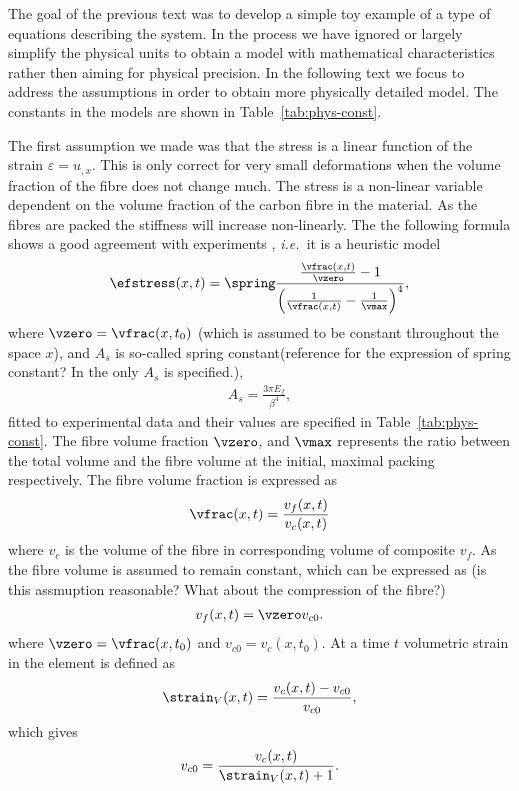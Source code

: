 \documentclass[twoside,a4paper,12pt]{article}
\newcommand{\tabref}[1]{Table~\ref{#1}}
\newcommand{\ie}{{\it i.e.\ }}
\newcommand{\note}[1]{{\color{red}(#1)}}
\begin{document}
The goal of the previous text was to develop a simple toy example of a
type of equations describing the system. In the process we have ignored
or largely simplify the physical units to obtain a model with
mathematical characteristics rather then aiming for physical
precision. In the following text we focus to address the assumptions
in order to obtain more physically detailed model. The constants in the
models are shown in \tabref{tab:phys-const}.

The first assumption we made was that the stress is a linear function
of the strain $\varepsilon = u_{,x}$. This is only correct for very
small deformations when the volume fraction of the fibre does not
change much.  The stress is a non-linear variable dependent on the
volume fraction of the carbon fibre in the material. As the fibres are
packed the stiffness will increase non-linearly. The the following
formula shows a good agreement with experiments \citet{Gutowski1987},
\ie it is a heuristic model
% 
\begin{align}
  \efstress(x,t) = \spring
  \frac{\frac{\vfrac(x,t)}{\vzero} -1}{\left(\frac{1}{\vfrac(x,t)} -\frac{1}{\vmax}\right)^4}, \label{eq:stress-nonlin}
\end{align}
%
where $\vzero = \vfrac(x,t_0)$ \note{which is assumed to be constant
  throughout the space $x$}, and $A_s$ is so-called spring
constant\note{reference for the expression of spring constant? In the
  \citet{Gutowski1987} only $A_s$ is specified.},
%
\begin{align}
  A_s = \frac{3\pi E_f}{\beta^4},
\end{align}
%
fitted to experimental data and their values are specified in
\tabref{tab:phys-const}.
%
The fibre volume fraction $\vzero$, and $\vmax$ represents the ratio
between the total volume and the fibre volume at the initial, maximal
packing respectively. The fibre volume fraction is expressed as
\begin{align}
  \vfrac(x,t) = \frac{v_f(x,t)}{v_c(x,t)}
\end{align}
%
where $v_c$ is the volume of the fibre in corresponding volume of
composite $v_f$. As the fibre volume is assumed to remain constant,
which can be expressed as
%
\note{is this assmuption reasonable? What about the compression of the fibre?}
%
\begin{align}
  v_f(x,t) = \vzero v_{c0}. \label{eq:fibre-fraction}
\end{align}
where $\vzero = \vfrac(x,t_0)$ and $v_{c0} = v_c(x,t_0)$.
%
At a time $t$ volumetric strain in the element is defined as
\begin{align}
  \strain_V(x,t) = \frac{v_c(x,t) - v_{c0}}{v_{c0}}, \label{eq:volumetric-strain}
\end{align}
which gives
%
\begin{align}
{v_{c0}}= \frac{v_c(x,t) }{\strain_V(x,t) + 1}. \label{eq:initial-volume}
\end{align}
\end{document}

